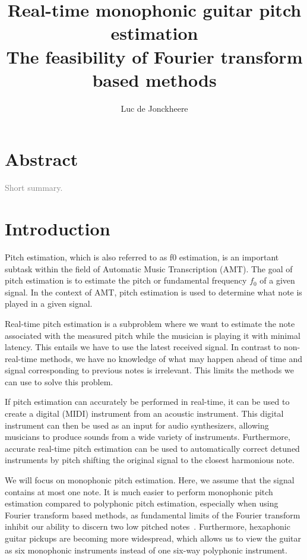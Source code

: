 \documentclass[10pt,twocolumn]{article}
\title{\textbf{Real-time monophonic guitar pitch estimation}\\The feasibility of Fourier transform based methods}
\author{Luc de Jonckheere}
\begin{document}

\maketitle


\section*{Abstract}
\textcolor{gray}{Short summary.}


\section{Introduction}
Pitch estimation, which is also referred to as f0 estimation, is an important subtask within the field of Automatic Music Transcription (AMT). The goal of pitch estimation is to estimate the pitch or fundamental frequency $f_0$ of a given signal. In the context of AMT, pitch estimation is used to determine what note is played in a given signal.

Real-time pitch estimation is a subproblem where we want to estimate the note associated with the measured pitch while the musician is playing it with minimal latency. This entails we have to use the latest received signal. In contrast to non-real-time methods, we have no knowledge of what may happen ahead of time and signal corresponding to previous notes is irrelevant. This limits the methods we can use to solve this problem.

If pitch estimation can accurately be performed in real-time, it can be used to create a digital (MIDI) instrument from an acoustic instrument. This digital instrument can then be used as an input for audio synthesizers, allowing musicians to produce sounds from a wide variety of instruments. Furthermore, accurate real-time pitch estimation can be used to automatically correct detuned instruments by pitch shifting the original signal to the closest harmonious note.


We will focus on monophonic pitch estimation. Here, we assume that the signal contains at most one note. It is much easier to perform monophonic pitch estimation compared to polyphonic pitch estimation, especially when using Fourier transform based methods, as fundamental limits of the Fourier transform inhibit our ability to discern two low pitched notes~\cite{nopoly}. Furthermore, hexaphonic guitar pickups are becoming more widespread, which allows us to view the guitar as six monophonic instruments instead of one six-way polyphonic instrument.
\end{document}
